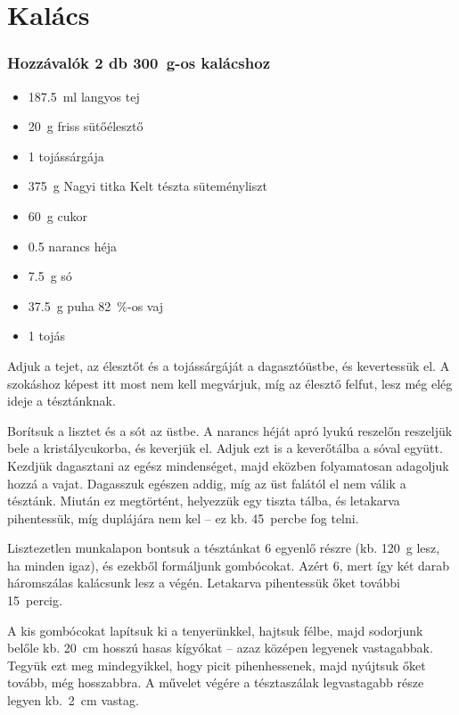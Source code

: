 \newpage
\section{Kalács} \label{sec:kalacs}

\subsubsection*{Hozzávalók 2 db \qty{300}{\g}-os kalácshoz}
\begin{itemize}
    \item \qty{187.5}{\ml} langyos tej
    \item \qty{20}{\g} friss sütőélesztő
    \item \num{1} tojássárgája
    \item \qty{375}{\g} Nagyi titka Kelt tészta süteményliszt
    \item \qty{60}{\g} cukor
    \item \num{0.5} narancs héja
    \item \qty{7.5}{\g} só
    \item \qty{37.5}{\g} puha \qty{82}{\percent}-os vaj
    \item \num{1} tojás
\end{itemize}

Adjuk a tejet, az élesztőt és a tojássárgáját a dagasztóüstbe, és kevertessük el. A szokáshoz képest itt most nem kell megvárjuk, míg az élesztő felfut, lesz még elég ideje a tésztánknak.

Borítsuk a lisztet és a sót az üstbe. A narancs héját apró lyukú reszelőn reszeljük bele a kristálycukorba, és keverjük el. Adjuk ezt is a keverőtálba a sóval együtt. Kezdjük dagasztani az egész mindenséget, majd eközben folyamatosan adagoljuk hozzá a vajat. Dagasszuk egészen addig, míg az üst falától el nem válik a tésztánk. Miután ez megtörtént, helyezzük egy tiszta tálba, és letakarva pihentessük, míg duplájára nem kel -- ez kb. \num{45}~percbe fog telni.

Lisztezetlen munkalapon bontsuk a tésztánkat 6 egyenlő részre (kb. \qty{120}{\g} lesz, ha minden igaz), és ezekből formáljunk gombócokat. Azért 6, mert így két darab háromszálas kalácsunk lesz a végén. Letakarva pihentessük őket további \num{15}~percig.

A kis gombócokat lapítsuk ki a tenyerünkkel, hajtsuk félbe, majd sodorjunk belőle kb. \qty{20}{\cm} hosszú hasas kígyókat -- azaz középen legyenek vastagabbak. Tegyük ezt meg mindegyikkel, hogy picit pihenhessenek, majd nyújtsuk őket tovább, még hosszabbra. A művelet végére a tésztaszálak legvastagabb része legyen kb.~\qty{2}{\cm} vastag.

